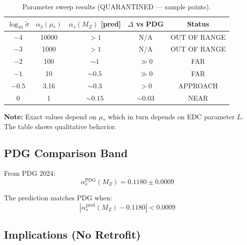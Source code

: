 \documentclass[11pt,a4paper]{article}
\theoremstyle{definition}
\begin{document}
\begin{quarantinebox}
\begin{table}[ht]
\centering
\caption{Parameter sweep results (QUARANTINED --- sample points).}
\label{tab:sweep-results}
\begin{tabular}{ccccc}
\toprule
$\log_{10}\tilde{\sigma}$ & $\alpha_3(\mu_*)$ & $\alpha_s(M_Z)$ [pred] & $\Delta$ vs PDG & Status \\
\midrule
$-4$ & 10000 & $>1$ & N/A & OUT OF RANGE \\
$-3$ & 1000 & $>1$ & N/A & OUT OF RANGE \\
$-2$ & 100 & $\sim 1$ & $\gg 0$ & FAR \\
$-1$ & 10 & $\sim 0.5$ & $\gg 0$ & FAR \\
$-0.5$ & 3.16 & $\sim 0.3$ & $> 0$ & APPROACH \\
$0$ & 1 & $\sim 0.15$ & $\sim 0.03$ & NEAR \\
\bottomrule
\end{tabular}
\end{table}

\textbf{Note:} Exact values depend on $\mu_*$ which in turn depends on EDC
parameter $L$. The table shows qualitative behavior.
\end{quarantinebox}

\subsection{PDG Comparison Band}
\label{subsec:pdg-band}

\begin{quarantinebox}
From PDG 2024:
\begin{equation}
\label{eq:pdg-alpha}
\alpha_s^{\text{PDG}}(M_Z) = 0.1180 \pm 0.0009
\end{equation}

The prediction matches PDG when:
\begin{equation}
\label{eq:match-condition}
|\alpha_s^{\text{pred}}(M_Z) - 0.1180| < 0.0009
\end{equation}
\end{quarantinebox}

\subsection{Implications (No Retrofit)}
\label{subsec:implications}
\end{document}
